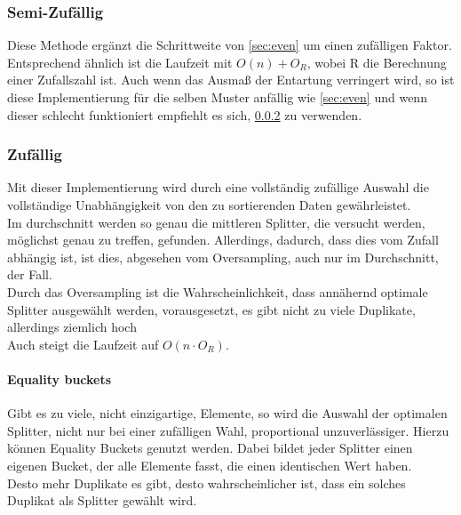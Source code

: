 		\subsubsection{Semi-Zufällig}
			\label{sec:semi-random}
			
			Diese Methode ergänzt die Schrittweite von \ref{sec:even} um einen zufälligen Faktor.
			Entsprechend ähnlich ist die Laufzeit mit $O(n)+O_R$, wobei R die Berechnung einer Zufallszahl ist.
			Auch wenn das Ausmaß der Entartung verringert wird, so ist diese Implementierung für die selben Muster anfällig wie \ref{sec:even} und wenn dieser schlecht funktioniert empfiehlt es sich, \ref{sec:random} zu verwenden.

		\subsubsection{Zufällig}
			\label{sec:random}
			
			Mit dieser Implementierung wird durch eine vollständig zufällige Auswahl die vollständige Unabhängigkeit von den zu sortierenden Daten gewährleistet.\\
			Im durchschnitt werden so genau die mittleren Splitter, die versucht werden, möglichst genau zu treffen, gefunden.
			Allerdings, dadurch, dass dies vom Zufall abhängig ist, ist dies, abgesehen vom Oversampling, auch nur im Durchschnitt, der Fall.\\
			Durch das Oversampling ist die Wahrscheinlichkeit, dass annähernd optimale Splitter ausgewählt werden, vorausgesetzt, es gibt nicht zu viele Duplikate, allerdings ziemlich hoch\\%
			Auch steigt die Laufzeit auf $O(n\cdot O_R)$.\\

			\paragraph{Equality buckets}
				Gibt es zu viele, nicht einzigartige, Elemente, so wird die Auswahl der optimalen Splitter, nicht nur bei einer zufälligen Wahl, proportional unzuverlässiger.
				Hierzu können Equality Buckets genutzt werden.
				Dabei bildet jeder Splitter einen eigenen Bucket, der alle Elemente fasst, die einen identischen Wert haben.\\
				Desto mehr Duplikate es gibt, desto wahrscheinlicher ist, dass ein solches Duplikat als Splitter gewählt wird.

